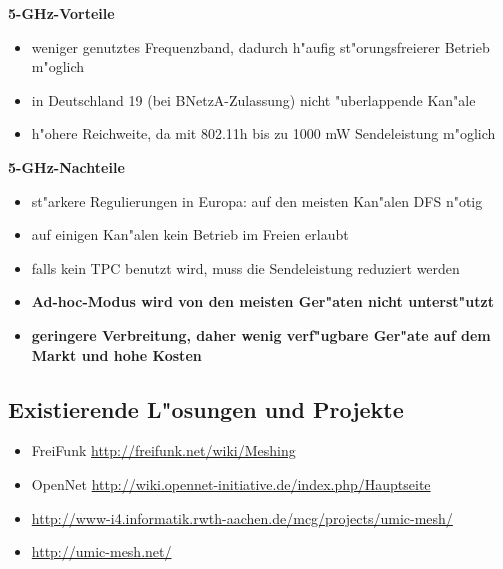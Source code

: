 \textbf{5-GHz-Vorteile }
\begin{itemize}
	\item weniger genutztes Frequenzband, dadurch h"aufig
	st"orungsfreierer Betrieb m"oglich 
	\item in Deutschland 19 (bei BNetzA-Zulassung) nicht "uberlappende
	Kan"ale 
	\item h"ohere Reichweite, da mit 802.11h bis zu 1000 mW Sendeleistung
	m"oglich 
\end{itemize}

\textbf{5-GHz-Nachteile }
\begin{itemize}
	\item st"arkere Regulierungen in Europa: auf den meisten Kan"alen DFS
	n"otig 
	\item auf einigen Kan"alen kein Betrieb im Freien erlaubt 
	\item falls kein TPC benutzt wird, muss die Sendeleistung reduziert
	werden 
	\item \textbf{Ad-hoc-Modus wird von den meisten Ger"aten
		nicht unterst"utzt }
	\item \textbf{geringere Verbreitung, daher wenig verf"ugbare Ger"ate
		auf dem Markt und hohe Kosten }
\end{itemize}



\subsection{Existierende L"osungen und Projekte}

\begin{itemize}
\item FreiFunk \url{http://freifunk.net/wiki/Meshing}
\item OpenNet \url{http://wiki.opennet-initiative.de/index.php/Hauptseite}
\item \url{http://www-i4.informatik.rwth-aachen.de/mcg/projects/umic-mesh/} 
\item \url{http://umic-mesh.net/}
\end{itemize}
